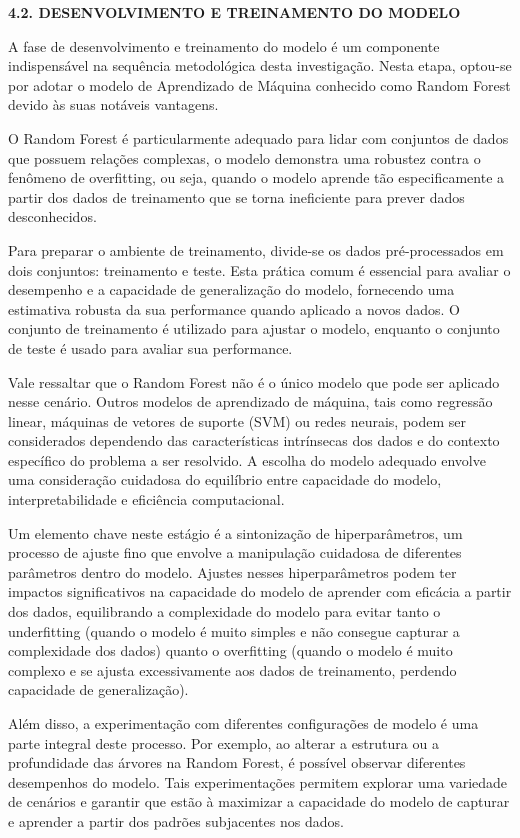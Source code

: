 \documentclass[
]{article}
\begin{document}
\textbf{4.2. DESENVOLVIMENTO E TREINAMENTO DO MODELO}

A fase de desenvolvimento e treinamento do modelo é um componente
indispensável na sequência metodológica desta investigação. Nesta etapa,
optou-se por adotar o modelo de Aprendizado de Máquina conhecido como
Random Forest devido às suas notáveis vantagens.

O Random Forest é particularmente adequado para lidar com conjuntos de
dados que possuem relações complexas, o modelo demonstra uma robustez
contra o fenômeno de overfitting, ou seja, quando o modelo aprende tão
especificamente a partir dos dados de treinamento que se torna
ineficiente para prever dados desconhecidos.

Para preparar o ambiente de treinamento, divide-se os dados
pré-processados em dois conjuntos: treinamento e teste. Esta prática
comum é essencial para avaliar o desempenho e a capacidade de
generalização do modelo, fornecendo uma estimativa robusta da sua
performance quando aplicado a novos dados. O conjunto de treinamento é
utilizado para ajustar o modelo, enquanto o conjunto de teste é usado
para avaliar sua performance.

Vale ressaltar que o Random Forest não é o único modelo que pode ser
aplicado nesse cenário. Outros modelos de aprendizado de máquina, tais
como regressão linear, máquinas de vetores de suporte (SVM) ou redes
neurais, podem ser considerados dependendo das características
intrínsecas dos dados e do contexto específico do problema a ser
resolvido. A escolha do modelo adequado envolve uma consideração
cuidadosa do equilíbrio entre capacidade do modelo, interpretabilidade e
eficiência computacional.

Um elemento chave neste estágio é a sintonização de hiperparâmetros, um
processo de ajuste fino que envolve a manipulação cuidadosa de
diferentes parâmetros dentro do modelo. Ajustes nesses hiperparâmetros
podem ter impactos significativos na capacidade do modelo de aprender
com eficácia a partir dos dados, equilibrando a complexidade do modelo
para evitar tanto o underfitting (quando o modelo é muito simples e não
consegue capturar a complexidade dos dados) quanto o overfitting (quando
o modelo é muito complexo e se ajusta excessivamente aos dados de
treinamento, perdendo capacidade de generalização).

Além disso, a experimentação com diferentes configurações de modelo é
uma parte integral deste processo. Por exemplo, ao alterar a estrutura
ou a profundidade das árvores na Random Forest, é possível observar
diferentes desempenhos do modelo. Tais experimentações permitem explorar
uma variedade de cenários e garantir que estão à maximizar a capacidade
do modelo de capturar e aprender a partir dos padrões subjacentes nos
dados.
\end{document}
